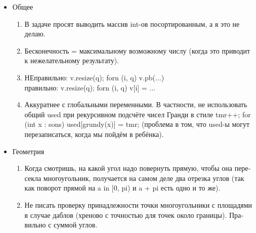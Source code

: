 \begin{itemize}
    \item \foreignlanguage{russian}{Общее}
        \begin{enumerate}
            \item \foreignlanguage{russian}{В задаче просят выводить массив int-ов посортированным, а я это не делаю.}
            
            \item \foreignlanguage{russian}{Бесконечность = максимальному возможному числу
(когда это приводит к нежелательному результату).}

            \item \foreignlanguage{russian}{НЕправильно: v.resize(q); forn (i, q) v.pb(...)\\ правильно: v.resize(q); forn (i, q) v[i] = ...}

            \item \foreignlanguage{russian}{Аккуратнее с глобальными переменными. В частности, не использовать общий used
при рекурсивном подсчёте чисел Гранди в стиле
tmr++; for (int x : sons) used[grundy(x)] = tmr;
(проблема в том, что used-ы могут перезаписаться, когда мы пойдём в ребёнка).}

        \end{enumerate}

    \item \foreignlanguage{russian}{Геометрия} 
        \begin{enumerate}
            \item \foreignlanguage{russian}{Когда смотришь, на какой угол надо повернуть прямую, чтобы она пересекла
            многоугольник, получается на самом деле два отрезка углов (так как поворот прямой
                на a in [0, pi) и a + pi есть одно и то же).}
            \item \foreignlanguage{russian}{Не писать проверку принадлежности точки многоугольники
            с площадями в случае даблов (хреново с точностью для точек около
            границы). Правильно с суммой углов.}
        \end{enumerate}

\end{itemize}

